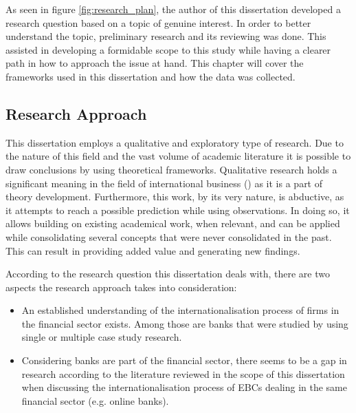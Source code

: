 \documentclass[11pt,a4paper]{article}
\begin{document}
{{As seen in figure \ref{fig:research_plan}, the author of this dissertation developed a research question based on a topic of genuine interest. In order to better understand the topic, preliminary research and its reviewing was done. This assisted in developing a formidable scope to this study while having a clearer path in how to approach the issue at hand. This chapter will cover the frameworks used in this dissertation and how the data was collected.


\subsection{Research Approach} %
 \par
This dissertation employs a qualitative and exploratory type of research. Due to the nature of this field and the vast volume of academic literature it is possible to draw conclusions by using theoretical frameworks. Qualitative research holds a significant meaning in the field of international business (\cite{dozQualitativeResearchInternational2011}) as it is a part of theory development. Furthermore, this work, by its very nature, is abductive, as it attempts to reach a possible prediction while using observations. In doing so, it allows building on existing academical work, when relevant, and can be applied while consolidating several concepts that were never consolidated in the past. This can result in providing added value and generating new findings. \par %
According to the research question this dissertation deals with, there are two aspects the research approach takes into consideration:
\begin{itemize}
 \item {An established understanding of the internationalisation process of firms in the financial sector exists. Among those are banks that were studied by using single or multiple case study research.}
 \item{Considering banks are part of the financial sector, there seems to be a gap in research according to the literature reviewed in the scope of this dissertation when discussing the internationalisation process of EBCs dealing in the same financial sector (e.g. online banks). }
\end{itemize}


}}
\end{document}
